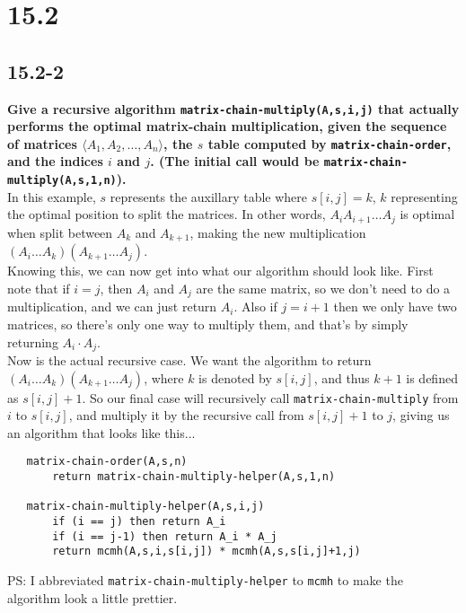 \documentclass[11pt]{article}
\begin{document}
 \section*{15.2}
 \subsection*{15.2-2}
 \textbf{Give a recursive algorithm \texttt{matrix-chain-multiply(A,s,i,j)} that actually 
 performs the optimal matrix-chain multiplication, given the sequence of matrices 
 $\langle A_1, A_2, \dots , A_n \rangle$, the $s$ table computed by \texttt{matrix-chain-order}, 
 and the indices $i$ and $j$. (The initial call would be 
 \texttt{matrix-chain-multiply(A,s,1,n)}).} \\
 
 In this example, $s$ represents the auxillary table where $s[i,j] = k$, $k$ representing the 
 optimal position to split the matrices.  In other words, $A_i A_{i+1} \dots A_j$ is optimal 
 when split between $A_k$ and $A_{k+1}$, making the new multiplication 
 $(A_i \dots A_k)(A_{k+1} \dots A_j)$. \\

 Knowing this, we can now get into what our algorithm should look like.  First note that if 
 $i=j$, then $A_i$ and $A_j$ are the same matrix, so we don't need to do a multiplication, and 
 we can just return $A_i$. 
 Also if $j=i+1$ then we only have two matrices, so there's only one way to multiply them, 
 and that's by simply returning $A_i \cdot A_j$. \\

 Now is the actual recursive case.  We want the algorithm to return
 $(A_i \dots A_k)(A_{k+1} \dots A_j)$, where $k$ is denoted by $s[i,j]$, and thus $k+1$ is 
 defined as $s[i,j]+1$.  So our final case will recursively call \texttt{matrix-chain-multiply} 
 from $i$ to $s[i,j]$, and multiply it by the recursive call from $s[i,j]+1$ to $j$, giving us 
 an algorithm that looks like this...

 \begin{verbatim}
   matrix-chain-order(A,s,n)
       return matrix-chain-multiply-helper(A,s,1,n)

   matrix-chain-multiply-helper(A,s,i,j)
       if (i == j) then return A_i
       if (i == j-1) then return A_i * A_j 
       return mcmh(A,s,i,s[i,j]) * mcmh(A,s,s[i,j]+1,j)
 \end{verbatim}
 PS: I abbreviated \texttt{matrix-chain-multiply-helper} to \texttt{mcmh} to make the algorithm 
 look a little prettier.
 \newpage
\end{document}
